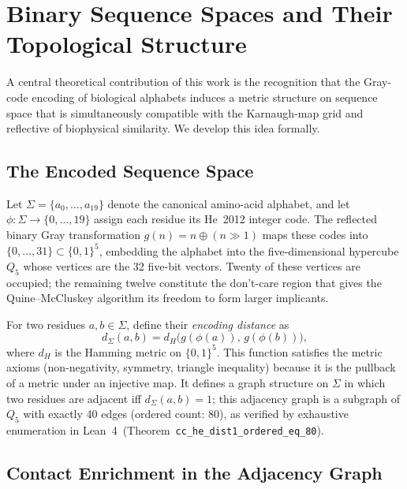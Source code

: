 \section{Binary Sequence Spaces and Their Topological Structure}
\label{sec:binary-spaces}

A central theoretical contribution of this work is the recognition that the
Gray-code encoding of biological alphabets induces a metric structure on
sequence space that is simultaneously compatible with the Karnaugh-map grid
and reflective of biophysical similarity.  We develop this idea formally.

\subsection{The Encoded Sequence Space}

Let $\Sigma = \{a_0, \ldots, a_{19}\}$ denote the canonical amino-acid
alphabet, and let $\phi : \Sigma \to \{0, \ldots, 19\}$ assign each residue
its He~2012 integer code.  The reflected binary Gray transformation $g(n) =
	n \oplus (n \gg 1)$ maps these codes into $\{0, \ldots, 31\} \subset \{0,1\}^5$,
embedding the alphabet into the five-dimensional hypercube $Q_5$ whose
vertices are the 32 five-bit vectors.  Twenty of these vertices are occupied;
the remaining twelve constitute the don't-care region that gives the
Quine--McCluskey algorithm its freedom to form larger implicants.

For two residues $a, b \in \Sigma$, define their \emph{encoding distance} as
\begin{equation}
	d_\Sigma(a, b) = d_H\!\bigl(g(\phi(a)),\, g(\phi(b))\bigr),
	\label{eq:encoding-distance}
\end{equation}
where $d_H$ is the Hamming metric on $\{0,1\}^5$.  This function satisfies
the metric axioms (non-negativity, symmetry, triangle inequality) because it
is the pullback of a metric under an injective map.  It defines a graph
structure on $\Sigma$ in which two residues are adjacent iff $d_\Sigma(a,b)
	= 1$; this adjacency graph is a subgraph of $Q_5$ with exactly 40 edges
(ordered count: 80), as verified by exhaustive enumeration in
Lean~4~(Theorem~\texttt{cc\_he\_dist1\_ordered\_eq\_80}).

\subsection{Contact Enrichment in the Adjacency Graph}

